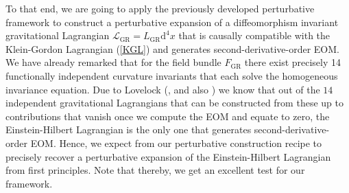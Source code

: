 To that end, we are going to apply the previously developed perturbative framework to construct a perturbative expansion of a diffeomorphism invariant gravitational Lagrangian $\mathcal{L}_{\text{GR}} = L_{\text{GR}} \mathrm{d}^4x$ that is causally compatible with the Klein-Gordon Lagrangian (\ref{KGL}) and generates second-derivative-order EOM. 
We have already remarked that for the field bundle $F_{\text{GR}}$ there exist precisely 14 functionally independent curvature invariants that each solve the homogeneous invariance equation. Due to Lovelock (\cite{Lovelock1969}, \cite{doi:10.1063/1.1665613} and also \cite{doi:10.1063/1.1666069}) we know that out of the $14$ independent gravitational Lagrangians that can be constructed from these up to contributions that vanish once we compute the EOM and equate to zero, the Einstein-Hilbert Lagrangian is the only one that generates second-derivative-order EOM. 
Hence, we expect from our perturbative construction recipe to precisely recover a perturbative expansion of the Einstein-Hilbert Lagrangian from first principles. Note that thereby, we get an excellent test for our framework. 



